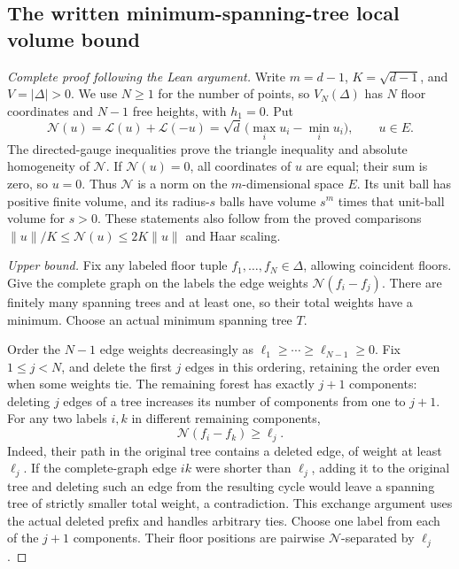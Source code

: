 \subsection{The written minimum-spanning-tree local volume bound}
\label{leanproof:ANT-3-6}
\begin{proof}[Complete proof following the Lean argument]
Write \(m=d-1\), \(K=\sqrt{d-1}\), and \(V=|\Delta|>0\).
We use \(N\ge1\) for the number of points, so \(V_N(\Delta)\)
has \(N\) floor coordinates and \(N-1\) free heights, with \(h_1=0\).
Put
\[
 \mathcal N(u)=\mathcal L(u)+\mathcal L(-u)
       =\sqrt d\,\bigl(\max_i u_i-\min_i u_i\bigr),\qquad u\in E.
\]
The directed-gauge inequalities prove the triangle inequality and
absolute homogeneity of \(\mathcal N\). If \(\mathcal N(u)=0\), all
coordinates of \(u\) are equal; their sum is zero, so \(u=0\).
Thus \(\mathcal N\) is a norm on the \(m\)-dimensional space \(E\).
Its unit ball has positive finite volume, and its radius-\(s\) balls
have volume \(s^m\) times that unit-ball volume for \(s>0\).
These statements also follow from the proved comparisons
\(\|u\|/K\le\mathcal N(u)\le2K\|u\|\) and Haar scaling.

\emph{Upper bound.}
Fix any labeled floor tuple \(f_1,\ldots,f_N\in\Delta\), allowing
coincident floors. Give the complete graph on the labels the edge weights
\(\mathcal N(f_i-f_j)\). There are finitely many spanning trees and at
least one, so their total weights have a minimum. Choose an actual
minimum spanning tree \(T\).

Order the \(N-1\) edge weights decreasingly as
\(\ell_1\ge\cdots\ge\ell_{N-1}\ge0\).
Fix \(1\le j<N\), and delete the first \(j\) edges in this ordering,
retaining the order even when some weights tie. The remaining forest has
exactly \(j+1\) components: deleting \(j\) edges of a tree increases its
number of components from one to \(j+1\).
For any two labels \(i,k\) in different remaining components,
\[
                    \mathcal N(f_i-f_k)\ge\ell_j.
\]
Indeed, their path in the original tree contains a deleted edge, of
weight at least \(\ell_j\). If the complete-graph edge \(ik\) were
shorter than \(\ell_j\), adding it to the original tree and deleting
such an edge from the resulting cycle would leave a spanning tree of
strictly smaller total weight, a contradiction. This exchange argument
uses the actual deleted prefix and handles arbitrary ties.
Choose one label from each of the \(j+1\) components. Their floor
positions are pairwise \(\mathcal N\)-separated by \(\ell_j\).


\end{proof}
